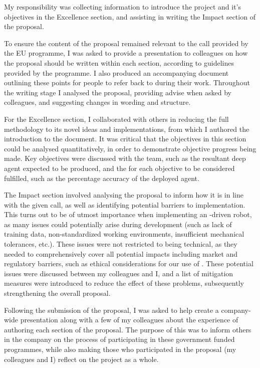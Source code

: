 My responsibility was collecting information to introduce the project and it's objectives in the
Excellence section, and assisting in writing the Impact section of the proposal.

To ensure the content of the proposal remained relevant to the call provided by the EU programme, I
was asked to provide a presentation to colleagues on how the proposal should be written within each
section, according to guidelines provided by the programme. I also produced an accompanying document
outlining these points for people to refer back to during their work. Throughout the writing stage I
analysed the proposal, providing advise when asked by colleagues, and suggesting changes in wording
and structure.

For the Excellence section, I collaborated with others in reducing the full methodology to its novel
ideas and implementations, from which I authored the introduction to the document. It was critical
that the objectives in this section could be analysed quantitatively, in order to demonstrate
objective progress being made. Key objectives were discussed with the team, such as the resultant
deep  agent expected to be produced, and the  for each objective to be
considered fulfilled, such as the percentage accuracy of the deployed  agent.

The Impact section involved analysing the proposal to inform how it is in line with the given call,
as well as identifying potential barriers to implementation. This turns out to be of utmost
importance when implementing an -driven robot, as many issues could potentially arise
during development (such as lack of training data, non-standardized working environments,
insufficient mechanical tolerances, etc.). These issues were not restricted to being technical, as
they needed to comprehensively cover all potential impacts including market and regulatory barriers,
such as ethical considerations for our use of \@. These potential issues were discussed
between my colleagues and I, and a list of mitigation measures were introduced to reduce the effect
of these problems, subsequently strengthening the overall proposal.

Following the submission of the proposal, I was asked to help create a company-wide presentation
along with a few of my colleagues about the experience of authoring each section of the proposal.
The purpose of this was to inform others in the company on the process of participating in these
government funded programmes, while also making those who participated in the proposal (my
colleagues and I) reflect on the project as a whole.

